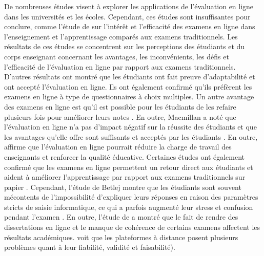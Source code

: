 \documentclass[french]{textolivre}
\begin{document}
De nombreuses études visent à explorer les applications de l'évaluation en ligne dans les universités et les écoles. Cependant, ces études sont insuffisantes pour conclure, comme l'étude de \textcite{cwil2019teacher} sur l’intérêt et l'efficacité des examens en ligne dans l'enseignement et l'apprentissage comparés aux examens traditionnels. Les résultats de ces études se concentrent sur les perceptions des étudiants et du corps enseignant concernant les avantages, les inconvénients, les défis et l'efficacité de l'évaluation en ligne par rapport aux examens traditionnels. D'autres résultats ont montré que les étudiants ont fait preuve d’adaptabilité et ont accepté l'évaluation en ligne. Ils ont également confirmé qu'ils préfèrent les examens en ligne à type de questionnaires à choix multiples. Un autre avantage des examens en ligne est qu’il est possible pour les étudiants de les refaire plusieurs fois pour améliorer leurs notes \cite{hodgson_effective_2012}. En outre, Macmillan a noté que l'évaluation en ligne n'a pas d'impact négatif sur la réussite des étudiants et que les avantages qu’elle offre sont suffisants et acceptés par les étudiants \cite{spivey_classroom_2014}. En outre, \textcite{wang2016design} affirme que l’évaluation en ligne pourrait réduire la charge de travail des enseignants et renforcer la qualité éducative. Certaines études ont également confirmé que les examens en ligne permettent un retour direct aux étudiants et aident à améliorer l'apprentissage par rapport aux examens traditionnels sur papier \cite{crews_online_2010}. Cependant, l'étude de Betlej montre que les étudiants sont souvent mécontents de l'impossibilité d'expliquer leurs réponses en raison des paramètres stricts de saisie informatique, ce qui a parfois augmenté leur stress et confusion pendant l'examen \cite{betlej2013examinations}. En outre, l'étude de \textcite{gewertz2013} a montré que le fait de rendre des dissertations en ligne et le manque de cohérence de certains examens affectent les résultats académiques. \textcite[p.204]{samlak2021evaluation} voit que les plateformes à distance posent plusieurs problèmes quant à leur fiabilité, validité et faisabilité).
\end{document}

